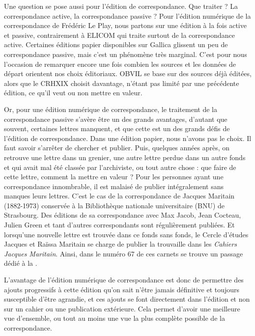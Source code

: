 Une question se pose aussi pour l'édition de correspondance. Que traiter ? La correspondance active, la correspondance passive ?
Pour l'édition numérique de la correspondance de Frédéric Le Play, nous partons sur une édition à la fois active et passive, contrairement à ELICOM qui traite surtout de la correspondance active. Certaines éditions papier disponibles sur Gallica glissent un peu de correspondance passive, mais c'est un phénomène très marginal. 
C'est pour nous l'occasion de remarquer encore une fois combien les sources et les données de départ orientent nos choix éditoriaux. OBVIL se base sur des sources déjà éditées, alors que le CRHXIX choisit davantage, n'étant pas limité par une précédente édition, ce qu'il veut ou non mettre en valeur.

Or, pour une édition numérique de correspondance, le traitement de la correspondance passive s'avère être un des grands avantages, d'autant que souvent, certaines lettres manquent, et que cette  est un des grands défis de l'édition de correspondance. Dans une édition papier, nous n'avons pas le choix. Il faut savoir s'arrêter de chercher et publier. Puis, quelques années après, on retrouve une lettre dans un grenier, une autre lettre perdue dans un autre fonds et qui avait mal été classée par l'archiviste, ou tout autre chose : que faire de cette lettre, comment la mettre en valeur ? Pour les personnes ayant une correspondance innombrable, il est malaisé de publier intégralement sans manques leurs lettres. C'est le cas de la correspondance de Jacques Maritain (1882-1973) conservée à la Bibliothèque nationale universitaire (BNU) de Strasbourg. Des éditions de sa correspondance avec Max Jacob, Jean Cocteau, Julien Green et tant d'autres correspondants sont régulièrement publiées. Et lorsqu'une nouvelle lettre est trouvée dans ce fonds sans fonds, le Cercle d'études Jacques et Raïssa Maritain se charge de publier la trouvaille dans les \emph{Cahiers Jacques Maritain}. Ainsi, dans le numéro 67  de ces carnets se trouve un passage dédié à la .

L'avantage de l'édition numérique de correspondance est donc de permettre des ajouts progressifs à cette édition qu'on sait n'être jamais définitive et toujours susceptible d'être agrandie, et ces ajouts se font directement dans l'édition et non sur un cahier ou une publication extérieure. Cela permet d'avoir une meilleure vue d'ensemble, ou tout au moins une vue la plus complète possible de la correspondance.\\

